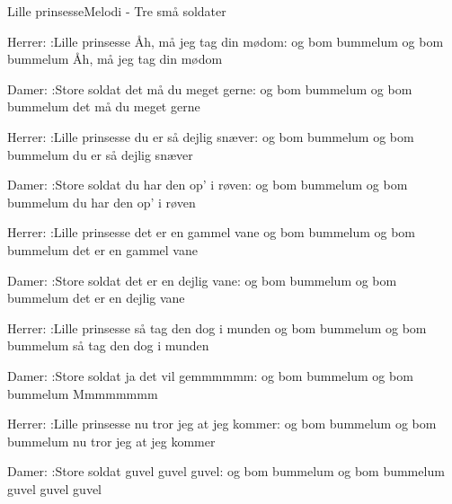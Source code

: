 \begin{sang}{Lille prinsesse}{Melodi - Tre små soldater}
\begin{vers}
Herrer:
:Lille prinsesse
Åh, må jeg tag din mødom:
og bom bummelum og bom bummelum
Åh, må jeg tag din mødom
\end{vers}
\begin{vers}
Damer:
:Store soldat
det må du meget gerne:
og bom bummelum og bom bummelum
det må du meget gerne
\end{vers}
\begin{vers}
Herrer:
:Lille prinsesse
du er så dejlig snæver:
og bom bummelum og bom bummelum
du er så dejlig snæver
\end{vers}
\begin{vers}
Damer:
:Store soldat
du har den op' i røven:
og bom bummelum og bom bummelum
du har den op' i røven
\end{vers}
\begin{vers}
Herrer:
:Lille prinsesse
det er en gammel vane
og bom bummelum og bom bummelum
det er en gammel vane
\end{vers}
\begin{vers}
Damer:
:Store soldat
det er en dejlig vane:
og bom bummelum og bom bummelum
det er en dejlig vane
\end{vers}
\begin{vers}
Herrer:
:Lille prinsesse
så tag den dog i munden
og bom bummelum og bom bummelum
så tag den dog i munden
\end{vers}
\begin{vers}
Damer:
:Store soldat
ja det vil gemmmmmm:
og bom bummelum og bom bummelum
Mmmmmmmm
\end{vers}
\begin{vers}
Herrer:
:Lille prinsesse
nu tror jeg at jeg kommer:
og bom bummelum og bom bummelum
nu tror jeg at jeg kommer
\end{vers}
\begin{vers}
Damer:
:Store soldat
guvel guvel guvel:
og bom bummelum og bom bummelum
guvel guvel guvel
\end{vers}
\laps
\end{sang}